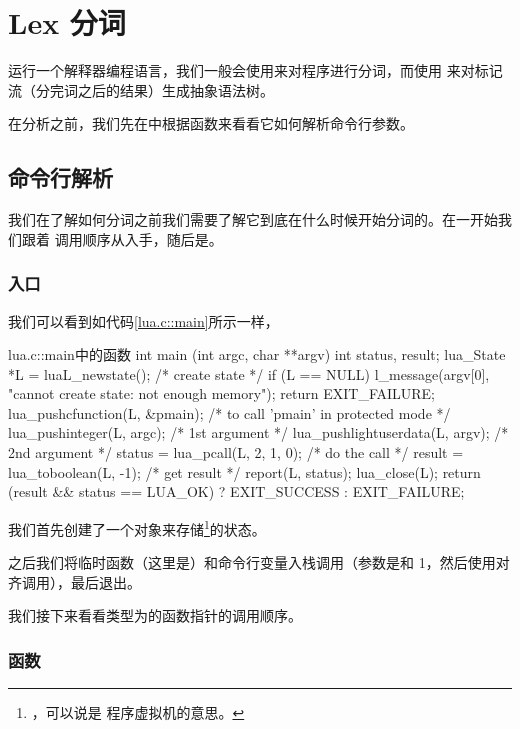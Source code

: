 

\chapter{Lex 分词}

运行一个解释器编程语言，我们一般会使用来对程序进行分词，而使用%
来对标记流（分完词之后的结果）生成抽象语法树。

在分析之前，我们先在中根据函数来看看它如何解析命令行参数。

\section{命令行解析}

我们在了解如何分词之前我们需要了解它到底在什么时候开始分词的。在一开始我们跟着
调用顺序从入手，随后是。

\subsection{入口}

我们可以看到如代码\ref{lua.c::main}所示一样，

\begin{ccode}{lua.c::main}{中的函数}
int main (int argc, char **argv) {
  int status, result;
  lua_State *L = luaL_newstate();  /* create state */
  if (L == NULL) {
    l_message(argv[0], "cannot create state: not enough memory");
    return EXIT_FAILURE;
  }
  lua_pushcfunction(L, &pmain);  /* to call 'pmain' in protected mode */
  lua_pushinteger(L, argc);  /* 1st argument */
  lua_pushlightuserdata(L, argv); /* 2nd argument */
  status = lua_pcall(L, 2, 1, 0);  /* do the call */
  result = lua_toboolean(L, -1);  /* get result */
  report(L, status);
  lua_close(L);
  return (result && status == LUA_OK) ? EXIT_SUCCESS : EXIT_FAILURE;
}
\end{ccode}

我们首先创建了一个对象来存储\footnote{，可以说是
程序虚拟机的意思。}的状态。

之后我们将临时函数（这里是）和命令行变量入栈调用（参数是和\cmd
{1}，然后使用对齐调用），最后退出。

我们接下来看看类型为的函数指针的调用顺序。

\subsection{函数}

